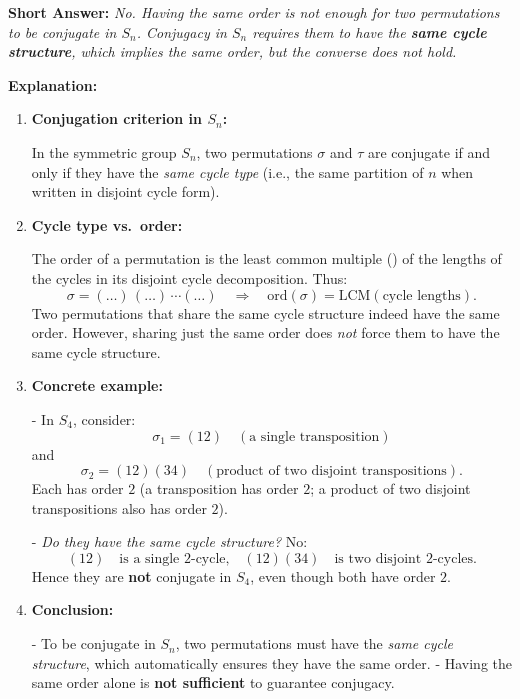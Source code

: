 \documentclass[12pt]{article}
\theoremstyle{definition} %
\theoremstyle{plain} %
\begin{document}
\bigskip

\noindent
\textbf{Short Answer:} 
\emph{No. Having the same order is not enough for two permutations to be conjugate in $S_n$. Conjugacy in $S_n$ requires them to have the \textbf{same cycle structure}, which \emph{implies} the same order, but the converse does \emph{not} hold.}

\bigskip

\noindent
\textbf{Explanation:}

\begin{enumerate}
    \item \textbf{Conjugation criterion in $S_n$:}
    
    In the symmetric group $S_n$, two permutations $\sigma$ and $\tau$ are conjugate if and only if they have the \emph{same cycle type} (i.e., the same partition of $n$ when written in disjoint cycle form). 

    \item \textbf{Cycle type vs.\ order:}
    
    The order of a permutation is the least common multiple () of the lengths of the cycles in its disjoint cycle decomposition. Thus:
    \[
       \sigma = (\dots)\,(\dots)\,\cdots(\dots)
       \quad\Longrightarrow\quad
       \mathrm{ord}(\sigma)
       = \mathrm{LCM}(\text{cycle lengths}).
    \]
    Two permutations that share the same cycle structure indeed have the same order. However, sharing just the same order does \emph{not} force them to have the same cycle structure. 

    \item \textbf{Concrete example:} 
    
    - In $S_4$, consider:
      \[
        \sigma_1 = (12) \quad (\text{a single transposition})
      \]
      and 
      \[
        \sigma_2 = (12)(34) \quad (\text{product of two disjoint transpositions}).
      \]
      Each has order $2$ (a transposition has order $2$; a product of two disjoint transpositions also has order $2$).

    - \emph{Do they have the same cycle structure?} No:
      \[
        (12) \quad\text{is a single 2-cycle,}
        \quad
        (12)(34) \quad\text{is two disjoint 2-cycles.}
      \]
      Hence they are \textbf{not} conjugate in $S_4$, even though both have order $2$.

    \item \textbf{Conclusion:}
    
    - To be conjugate in $S_n$, two permutations must have the \emph{same cycle structure}, which automatically ensures they have the same order.
    - Having the same order alone is \textbf{not sufficient} to guarantee conjugacy.

\end{enumerate}
\end{document}
